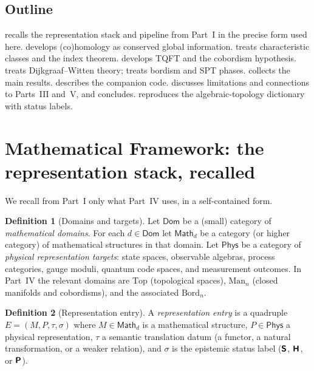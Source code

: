 \documentclass[12pt]{article}
\theoremstyle{definition}
\newtheorem{definition}[definition]{Definition}
\theoremstyle{remark}
\newcommand{\Bord}{\mathrm{Bord}}
\newcommand{\Top}{\mathrm{Top}}
\newcommand{\Man}{\mathrm{Man}}
\newcommand{\Dom}{\mathsf{Dom}}
\newcommand{\Phys}{\mathsf{Phys}}
\newcommand{\Math}{\mathsf{Math}}
\newcommand{\Sfont}{\textnormal{\sffamily\bfseries S}}
\newcommand{\Hfont}{\textnormal{\sffamily\bfseries H}}
\newcommand{\Pfont}{\textnormal{\sffamily\bfseries P}}
\begin{document}
\subsection{Outline}

 recalls the representation stack and pipeline from Part~I in
the precise form used here.  develops (co)homology as conserved
global information.  treats characteristic classes and the index
theorem.  develops TQFT and the cobordism hypothesis.
 treats Dijkgraaf--Witten theory;  treats bordism
and SPT phases.  collects the main results. 
describes the companion code.  discusses limitations and
connections to Parts~III and~V, and  concludes.
 reproduces the algebraic-topology dictionary with status labels.

\section{Mathematical Framework: the representation stack, recalled}
\label{sec:framework}

We recall from Part~I only what Part~IV uses, in a self-contained form.

\begin{definition}[Domains and targets]
\label{def:dom}
Let $\Dom$ be a (small) category of \emph{mathematical domains}. For each
$d\in\Dom$ let $\Math_d$ be a category (or higher category) of mathematical
structures in that domain. Let $\Phys$ be a category of \emph{physical
representation targets}: state spaces, observable algebras, process categories,
gauge moduli, quantum code spaces, and measurement outcomes. In Part~IV the
relevant domains are $\Top$ (topological spaces), $\Man_n$ (closed manifolds and
cobordisms), and the associated $\Bord_n$.
\end{definition}

\begin{definition}[Representation entry]
\label{def:entry}
A \emph{representation entry} is a quadruple $E=(M,P,\tau,\sigma)$ where
$M\in\Math_d$ is a mathematical structure, $P\in\Phys$ a physical representation,
$\tau$ a semantic translation datum (a functor, a natural transformation, or a
weaker relation), and $\sigma$ is the epistemic status label ($\Sfont$, $\Hfont$,
or $\Pfont$).
\end{definition}
\end{document}
